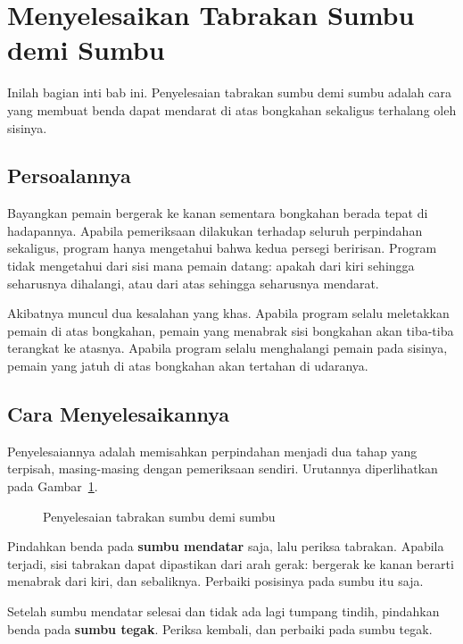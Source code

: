 \section{Menyelesaikan Tabrakan Sumbu demi Sumbu}
\label{sec:per-sumbu}

Inilah bagian inti bab ini. Penyelesaian tabrakan sumbu demi sumbu adalah cara
yang membuat benda dapat mendarat di atas bongkahan sekaligus terhalang oleh
sisinya.

\subsection{Persoalannya}

Bayangkan pemain bergerak ke kanan sementara bongkahan berada tepat di
hadapannya. Apabila pemeriksaan dilakukan terhadap seluruh perpindahan
sekaligus, program hanya mengetahui bahwa kedua persegi beririsan. Program
tidak mengetahui dari sisi mana pemain datang: apakah dari kiri sehingga
seharusnya dihalangi, atau dari atas sehingga seharusnya mendarat.

Akibatnya muncul dua kesalahan yang khas. Apabila program selalu meletakkan
pemain di atas bongkahan, pemain yang menabrak sisi bongkahan akan tiba-tiba
terangkat ke atasnya. Apabila program selalu menghalangi pemain pada sisinya,
pemain yang jatuh di atas bongkahan akan tertahan di udaranya.

\subsection{Cara Menyelesaikannya}

Penyelesaiannya adalah memisahkan perpindahan menjadi dua tahap yang terpisah,
masing-masing dengan pemeriksaan sendiri. Urutannya diperlihatkan pada
Gambar~\ref{fig:tabrakan-per-sumbu}.

\begin{figure}[htbp]
\centering

\caption{Penyelesaian tabrakan sumbu demi sumbu}
\label{fig:tabrakan-per-sumbu}
\end{figure}

\begin{langkah}
  \item Pindahkan benda pada \textbf{sumbu mendatar} saja, lalu periksa
        tabrakan. Apabila terjadi, sisi tabrakan dapat dipastikan dari arah
        gerak: bergerak ke kanan berarti menabrak dari kiri, dan sebaliknya.
        Perbaiki posisinya pada sumbu itu saja.
  \item Setelah sumbu mendatar selesai dan tidak ada lagi tumpang tindih,
        pindahkan benda pada \textbf{sumbu tegak}. Periksa kembali, dan
        perbaiki pada sumbu tegak.
\end{langkah}

